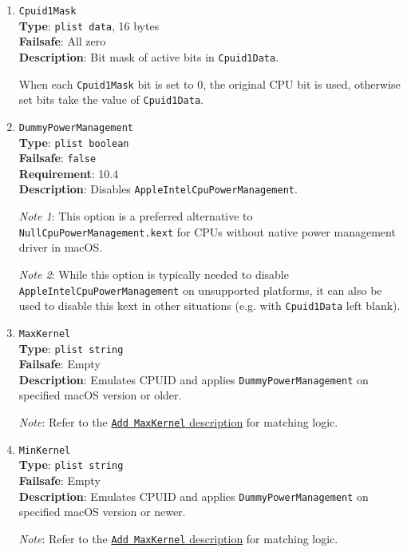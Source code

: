 \documentclass[]{article}
\begin{document}
\begin{enumerate}
\item
  \texttt{Cpuid1Mask}\\
  \textbf{Type}: \texttt{plist\ data}, 16 bytes\\
  \textbf{Failsafe}: All zero\\
  \textbf{Description}: Bit mask of active bits in \texttt{Cpuid1Data}.

  When each \texttt{Cpuid1Mask} bit is set to 0, the original CPU bit is used,
  otherwise set bits take the value of \texttt{Cpuid1Data}.

\item
  \texttt{DummyPowerManagement}\\
  \textbf{Type}: \texttt{plist\ boolean}\\
  \textbf{Failsafe}: \texttt{false}\\
  \textbf{Requirement}: 10.4\\
  \textbf{Description}: Disables \texttt{AppleIntelCpuPowerManagement}.

  \emph{Note 1}: This option is a preferred alternative to
  \texttt{NullCpuPowerManagement.kext} for CPUs without native power
  management driver in macOS.

  \emph{Note 2}: While this option is typically needed to disable \texttt{AppleIntelCpuPowerManagement}
  on unsupported platforms, it can also be used to disable this kext in other situations
  (e.g. with \texttt{Cpuid1Data} left blank).

\item
  \texttt{MaxKernel}\\
  \textbf{Type}: \texttt{plist\ string}\\
  \textbf{Failsafe}: Empty\\
  \textbf{Description}: Emulates CPUID and applies \texttt{DummyPowerManagement} on specified macOS version or older.

  \emph{Note}: Refer to the \hyperlink{kernmatch}{\texttt{Add\ MaxKernel} description} for matching logic.

\item
  \texttt{MinKernel}\\
  \textbf{Type}: \texttt{plist\ string}\\
  \textbf{Failsafe}: Empty\\
  \textbf{Description}: Emulates CPUID and applies \texttt{DummyPowerManagement} on specified macOS version or newer.

  \emph{Note}: Refer to the \hyperlink{kernmatch}{\texttt{Add\ MaxKernel} description} for matching logic.

\end{enumerate}
\end{document}
